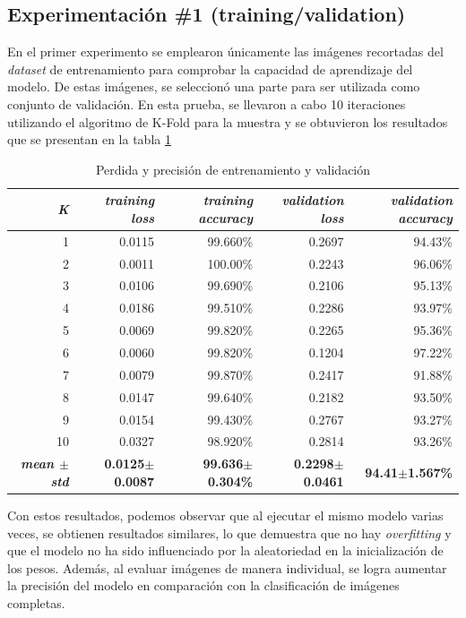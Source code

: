 \subsection{Experimentación \#1 (training/validation)}

En el primer experimento se emplearon únicamente las imágenes recortadas del \textit{dataset} 
de entrenamiento para comprobar la capacidad de aprendizaje del modelo. De estas imágenes, 
se seleccionó una parte para ser utilizada como conjunto de validación. En esta prueba, 
se llevaron a cabo 10 iteraciones utilizando el algoritmo de K-Fold para la muestra y se 
obtuvieron los resultados que se presentan en la tabla \ref{table:KFolds1}
\\

\begin{table}[h!]
\footnotesize
\centering
\begin{tabular}{|r|r|r|r|r|}
\hline
\textit{K} & \textit{training loss} & \textit{training accuracy} & \textit{validation loss} & \textit{validation accuracy} \\ \hline
1    & 0.0115      & 99.660\%    & 0.2697    & 94.43\%  \\ \hline
2    & 0.0011      & 100.00\%   & 0.2243    & 96.06\%  \\ \hline
3    & 0.0106      & 99.690\%    & 0.2106    & 95.13\%  \\ \hline
4    & 0.0186      & 99.510\%    & 0.2286    & 93.97\%  \\ \hline
5    & 0.0069      & 99.820\%    & 0.2265    & 95.36\%  \\ \hline
6    & 0.0060      & 99.820\%    & 0.1204    & 97.22\%  \\ \hline
7    & 0.0079      & 99.870\%    & 0.2417    & 91.88\%  \\ \hline
8    & 0.0147      & 99.640\%    & 0.2182    & 93.50\%  \\ \hline
9    & 0.0154      & 99.430\%    & 0.2767    & 93.27\%  \\ \hline
10   & 0.0327      & 98.920\%    & 0.2814    & 93.26\%  \\ \hline
\textbf{\textit{mean $\pm$ std}}     & \textbf{0.0125$\pm$0.0087}      & \textbf{99.636$\pm$0.304\%}    & \textbf{0.2298$\pm$0.0461}    & \textbf{94.41$\pm$1.567\%}  \\ \hline
\end{tabular}
\caption{Perdida y precisión de entrenamiento y validación}
\label{table:KFolds1}
\end{table}
Con estos resultados, podemos observar que al ejecutar el mismo modelo varias veces, se 
obtienen resultados similares, lo que demuestra que no hay \textit{overfitting} y que el 
modelo no ha sido influenciado por la aleatoriedad en la inicialización de los pesos. Además, 
al evaluar imágenes de manera individual, se logra aumentar la precisión del modelo en 
comparación con la clasificación de imágenes completas.
\\

